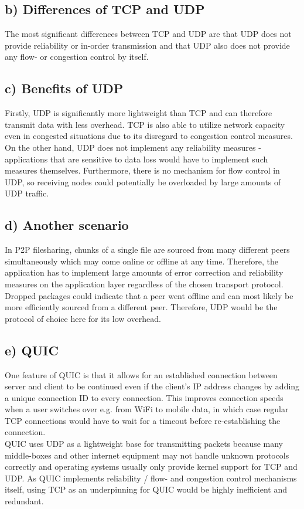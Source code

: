 \documentclass[a4paper, 11 pt, article, accentcolor=tud7b]{tudreport}
\begin{document}
	\subsection*{b) Differences of TCP and UDP}
	The most significant differences between TCP and UDP are that UDP does not provide reliability or in-order transmission and that UDP also does not provide any flow- or congestion control by itself.
	
	\subsection*{c) Benefits of UDP}
	Firstly, UDP is significantly more lightweight than TCP and can therefore transmit data with less overhead. TCP is also able to utilize network capacity even in congested situations due to its disregard to congestion control measures. On the other hand, UDP does not implement any reliability measures - applications that are sensitive to data loss would have to implement such measures themselves. Furthermore, there is no mechanism for flow control in UDP, so receiving nodes could potentially be overloaded by large amounts of UDP traffic.
	
	\subsection*{d) Another scenario}
	In P2P filesharing, chunks of a single file are sourced from many different peers simultaneously which may come online or offline at any time. Therefore, the application has to implement large amounts of error correction and reliability measures on the application layer regardless of the chosen transport protocol. Dropped packages could indicate that a peer went offline and can most likely be more efficiently sourced from a different peer. Therefore, UDP would be the protocol of choice here for its low overhead.
	
	\subsection*{e) QUIC}
	One feature of QUIC is that it allows for an established connection between server and client to be continued even if the client's IP address changes by adding a unique connection ID to every connection. This improves connection speeds when a user switches over e.g. from WiFi to mobile data, in which case regular TCP connections would have to wait for a timeout before re-establishing the connection. \\
	QUIC uses UDP as a lightweight base for transmitting packets because many middle-boxes and other internet equipment may not handle unknown protocols correctly and operating systems usually only provide kernel support for TCP and UDP. As QUIC implements reliability / flow- and congestion control mechanisms itself, using TCP as an underpinning for QUIC would be highly inefficient and redundant.
	
\end{document}
